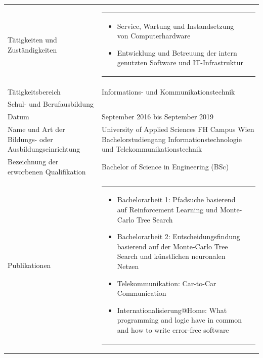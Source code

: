 \begin{longtable}{p{}|p{}}
	Tätigkeiten und Zuständigkeiten &
	\begin{tabular} {m{} m{} }
	\begin{itemize}[nosep,leftmargin=1em]
	\item Service, Wartung und Instandsetzung von Computerhardware
	\item Entwicklung und Betreuung der intern genutzten Software und IT-Infrastruktur
	\end{itemize}
	\end{tabular}
	\\
	Tätigkeitsbereich & Informations- und Kommunikationstechnik \\ \bottomrule
	\large{Schul- und Berufausbildung} & \\
    Datum & September 2016 bis September 2019 \\
    Name und Art der Bildungs- oder Ausbildungseinrichtung & University of Applied Sciences FH Campus Wien \newline
    Bachelorstudiengang Informationstechnologie und Telekommunikationstechnik \\
    Bezeichnung der erworbenen Qualifikation & Bachelor of Science in Engineering (BSc) \\
    Publikationen &
    \begin{tabular} {m{} m{} }
    \begin{itemize}[nosep,leftmargin=1em]
	\item Bachelorarbeit 1: Pfadsuche basierend auf Reinforcement Learning und Monte-Carlo Tree Search
	\item Bachelorarbeit 2: Entscheidungsfindung basierend auf der Monte-Carlo Tree Search und künstlichen neuronalen Netzen
    \item Telekommunikation: Car-to-Car Communication
	\item Internationalisierung@Home: What programming and logic have in common and how to write error-free software

\end{itemize}
\end{tabular}
\end{longtable}

